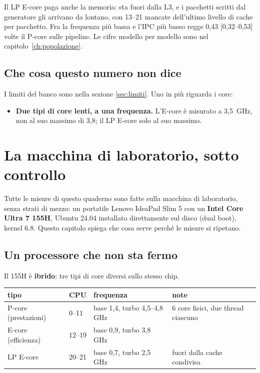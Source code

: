 \documentclass[11pt,a4paper,oneside]{report}
\begin{document}
Il LP E-core paga anche la memoria: sta fuori dalla L3, e i pacchetti scritti
dal generatore gli arrivano da lontano, con 13--21 mancate dell'ultimo livello
di cache per pacchetto. Fra la frequenza più bassa e l'IPC più basso regge
0,43 [0,32--0,53] volte il P-core sulle pipeline. Le cifre modello per modello
sono nel capitolo~\ref{ch:popolazione}.

\section{Che cosa questo numero non dice}

I limiti del banco sono nella sezione \ref{sec:limiti}. Uno in più riguarda i
core:

\begin{itemize}
  \item \textbf{Due tipi di core lenti, a una frequenza.} L'E-core è misurato a
        3,5~GHz, non al suo massimo di 3,8; il LP E-core solo al suo massimo.
\end{itemize}

\chapter{La macchina di laboratorio, sotto controllo}
\label{ch:macchina}

Tutte le misure di questo quaderno sono fatte sulla macchina di laboratorio,
senza strati di mezzo: un portatile Lenovo IdeaPad Slim 5 con un \textbf{Intel
Core Ultra 7 155H}, Ubuntu 24.04 installato direttamente sul disco (dual boot),
kernel 6.8. Questo capitolo spiega che cosa serve perché le misure si ripetano.

\section{Un processore che non sta fermo}

Il 155H è \textbf{ibrido}: tre tipi di core diversi sullo stesso chip.

\begin{center}
\small
\begin{tabular}{@{}llll@{}}
\toprule
\textbf{tipo} & \textbf{CPU} & \textbf{frequenza} & \textbf{note} \\
\midrule
P-core (prestazioni) & 0--11 & base 1,4, turbo 4,5--4,8 GHz & 6 core fisici, due thread ciascuno \\
E-core (efficienza) & 12--19 & base 0,9, turbo 3,8 GHz & \\
LP E-core & 20--21 & base 0,7, turbo 2,5 GHz & fuori dalla cache condivisa \\
\bottomrule
\end{tabular}
\end{center}
\end{document}
